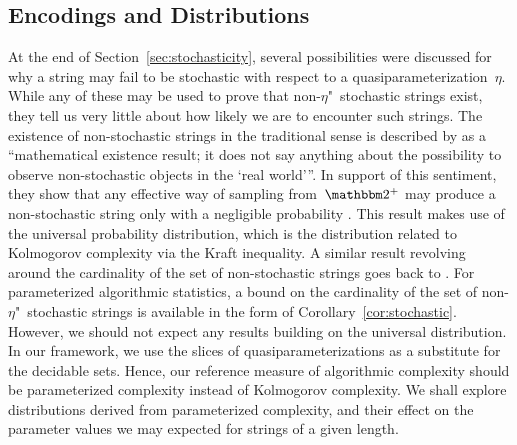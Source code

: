 \subsection{Encodings and Distributions}
\label{sec:encodings_distributions}%
At the end of Section~\ref{sec:stochasticity}, several possibilities were discussed for why a string may fail to be stochastic with respect to a quasiparameterization~$\eta$.
While any of these may be used to prove that non-$\eta$"~stochastic strings exist, they tell us very little about how likely we are to encounter such strings.
The existence of non-stochastic strings in the traditional sense is described by \citeauthor{vereshchagin2017algorithmic} as a \enquote{mathematical existence result; it does not say anything about the possibility to observe non-stochastic objects in the \enquote{real world}}.
In support of this sentiment, they show that any effective way of sampling from~$\binary^+$ may produce a non-stochastic string only with a negligible probability \parencite{muchnik1998mathematical,vereshchagin2017algorithmic}.
This result makes use of the universal probability distribution, which is the distribution related to Kolmogorov complexity via the Kraft inequality.
A similar result revolving around the cardinality of the set of non-stochastic strings goes back to \textcite[][Theorem~3]{shen1983concept}.
For parameterized algorithmic statistics, a bound on the cardinality of the set of non-$\eta$"~stochastic strings is available in the form of Corollary~\ref{cor:stochastic}.
However, we should not expect any results building on the universal distribution.
In our framework, we use the slices of quasiparameterizations as a substitute for the decidable sets.
Hence, our reference measure of algorithmic complexity should be parameterized complexity instead of Kolmogorov complexity.
We shall explore distributions derived from parameterized complexity, and their effect on the parameter values we may expected for strings of a given length.

